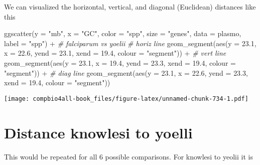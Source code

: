 \documentclass[
]{book}
\newenvironment{Shaded}{\begin{snugshade}}{\end{snugshade}}
\newcommand{\AttributeTok}[1]{\textcolor[rgb]{0.77,0.63,0.00}{#1}}
\newcommand{\CommentTok}[1]{\textcolor[rgb]{0.56,0.35,0.01}{\textit{#1}}}
\newcommand{\FloatTok}[1]{\textcolor[rgb]{0.00,0.00,0.81}{#1}}
\newcommand{\FunctionTok}[1]{\textcolor[rgb]{0.00,0.00,0.00}{#1}}
\newcommand{\NormalTok}[1]{#1}
\newcommand{\SpecialCharTok}[1]{\textcolor[rgb]{0.00,0.00,0.00}{#1}}
\newcommand{\StringTok}[1]{\textcolor[rgb]{0.31,0.60,0.02}{#1}}
\begin{document}
We can visualized the horizontal, vertical, and diagonal (Euclidean) distances like this

\begin{Shaded}
\begin{Highlighting}[]
\FunctionTok{ggscatter}\NormalTok{(}\AttributeTok{y =} \StringTok{"mb"}\NormalTok{,}
          \AttributeTok{x =} \StringTok{"GC"}\NormalTok{,}
          \AttributeTok{color =} \StringTok{"spp"}\NormalTok{,}
          \AttributeTok{size =} \StringTok{"genes"}\NormalTok{,}
          \AttributeTok{data =}\NormalTok{ plasmo,}
          \AttributeTok{label =} \StringTok{"spp"}\NormalTok{) }\SpecialCharTok{+}
  \CommentTok{\# falciparum vs yoelii}
   \CommentTok{\# horiz line}
   \FunctionTok{geom\_segment}\NormalTok{(}\FunctionTok{aes}\NormalTok{(}\AttributeTok{y    =} \FloatTok{23.1}\NormalTok{,    }\AttributeTok{x =} \FloatTok{22.6}\NormalTok{, }
                   \AttributeTok{yend =} \FloatTok{23.1}\NormalTok{, }\AttributeTok{xend =} \FloatTok{19.4}\NormalTok{, }
                   \AttributeTok{colour =} \StringTok{"segment"}\NormalTok{)) }\SpecialCharTok{+}
  \CommentTok{\# vert line}
   \FunctionTok{geom\_segment}\NormalTok{(}\FunctionTok{aes}\NormalTok{(}\AttributeTok{y    =} \FloatTok{23.1}\NormalTok{,    }\AttributeTok{x =} \FloatTok{19.4}\NormalTok{, }
                   \AttributeTok{yend =} \FloatTok{23.3}\NormalTok{, }\AttributeTok{xend =} \FloatTok{19.4}\NormalTok{, }
                   \AttributeTok{colour =} \StringTok{"segment"}\NormalTok{)) }\SpecialCharTok{+}
  \CommentTok{\# diag line}
  \FunctionTok{geom\_segment}\NormalTok{(}\FunctionTok{aes}\NormalTok{(}\AttributeTok{y    =} \FloatTok{23.1}\NormalTok{,    }\AttributeTok{x =} \FloatTok{22.6}\NormalTok{, }
                   \AttributeTok{yend =} \FloatTok{23.3}\NormalTok{, }\AttributeTok{xend =} \FloatTok{19.4}\NormalTok{, }
                   \AttributeTok{colour =} \StringTok{"segment"}\NormalTok{))}
\end{Highlighting}
\end{Shaded}

\texttt{[image: compbio4all-book\_files/figure-latex/unnamed-chunk-734-1.pdf]}

\hypertarget{distance-knowlesi-to-yoelli}{%
\section{Distance knowlesi to yoelli}\label{distance-knowlesi-to-yoelli}}

This would be repeated for all 6 possible comparisons. For knowlesi to yeolii it is
\end{document}
